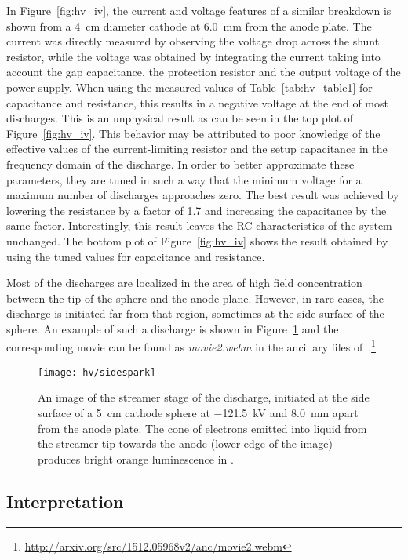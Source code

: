 In Figure~\ref{fig:hv_iv}, the current and voltage features of a similar breakdown is shown from a \SI{4}{\centi\metre} diameter cathode at \SI{6.0}{\milli\metre} from the anode plate.
The current was directly measured by observing the voltage drop across the shunt resistor, while the voltage was obtained by integrating the current taking into account the gap capacitance, the protection resistor and the output voltage of the power supply.
When using the measured values of Table~\ref{tab:hv_table1} for capacitance and resistance, this results in a negative voltage at the end of most discharges.
This is an unphysical result as can be seen in the top plot of Figure~\ref{fig:hv_iv}.
This behavior may be attributed to poor knowledge of the effective values of the current-limiting resistor and the setup capacitance in the frequency domain of the discharge.
In order to better approximate these parameters, they are tuned in such a way that the minimum voltage for a maximum number of discharges approaches zero.
The best result was achieved by lowering the resistance by a factor of 1.7 and increasing the capacitance by the same factor.
Interestingly, this result leaves the RC characteristics of the system unchanged.
The bottom plot of Figure~\ref{fig:hv_iv} shows the result obtained by using the tuned values for capacitance and resistance.

Most of the discharges are localized in the area of high field concentration between the tip of the sphere and the anode plane.
However, in rare cases, the discharge is initiated far from that region, sometimes at the side surface of the sphere.
An example of such a discharge is shown in Figure~\ref{fig:hv_side} and the corresponding movie can be found as \emph{movie2.webm} in the ancillary files of~\cite{breakdown_16}.\footnote{\url{http://arxiv.org/src/1512.05968v2/anc/movie2.webm}}

\begin{figure}[htb]
	\centering	
	\texttt{[image: hv/sidespark]}
	\caption{An image of the streamer stage of the discharge, initiated at the side surface of a \SI{5}{\centi\metre} cathode sphere at \SI{-121.5}{\kilo\volt} and \SI{8.0}{\milli\metre} apart from the anode plate. The cone of electrons emitted into liquid from the streamer tip towards the anode (lower edge of the image) produces bright orange luminescence in \lar{}.}
	\label{fig:hv_side}
\end{figure}


\subsection{Interpretation}
\label{sec:studies_hv_interpretation}

